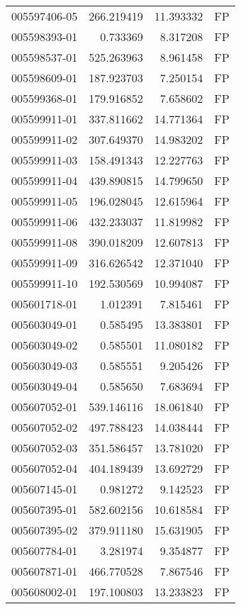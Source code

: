 \begin{tabular}{lrrl}
005597406-05 &  266.219419 &    11.393332 &   FP \\
005598393-01 &    0.733369 &     8.317208 &   FP \\
005598537-01 &  525.263963 &     8.961458 &   FP \\
005598609-01 &  187.923703 &     7.250154 &   FP \\
005599368-01 &  179.916852 &     7.658602 &   FP \\
005599911-01 &  337.811662 &    14.771364 &   FP \\
005599911-02 &  307.649370 &    14.983202 &   FP \\
005599911-03 &  158.491343 &    12.227763 &   FP \\
005599911-04 &  439.890815 &    14.799650 &   FP \\
005599911-05 &  196.028045 &    12.615964 &   FP \\
005599911-06 &  432.233037 &    11.819982 &   FP \\
005599911-08 &  390.018209 &    12.607813 &   FP \\
005599911-09 &  316.626542 &    12.371040 &   FP \\
005599911-10 &  192.530569 &    10.994087 &   FP \\
005601718-01 &    1.012391 &     7.815461 &   FP \\
005603049-01 &    0.585495 &    13.383801 &   FP \\
005603049-02 &    0.585501 &    11.080182 &   FP \\
005603049-03 &    0.585551 &     9.205426 &   FP \\
005603049-04 &    0.585650 &     7.683694 &   FP \\
005607052-01 &  539.146116 &    18.061840 &   FP \\
005607052-02 &  497.788423 &    14.038444 &   FP \\
005607052-03 &  351.586457 &    13.781020 &   FP \\
005607052-04 &  404.189439 &    13.692729 &   FP \\
005607145-01 &    0.981272 &     9.142523 &   FP \\
005607395-01 &  582.602156 &    10.618584 &   FP \\
005607395-02 &  379.911180 &    15.631905 &   FP \\
005607784-01 &    3.281974 &     9.354877 &   FP \\
005607871-01 &  466.770528 &     7.867546 &   FP \\
005608002-01 &  197.100803 &    13.233823 &   FP \\

\end{tabular}
